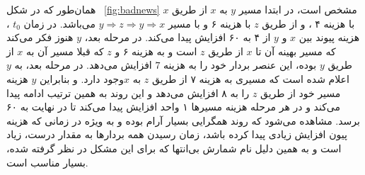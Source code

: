 همان‌طور که در شکل 
~\ref{fig:badnews}
مشخص است، در ابتدا مسیر $y$ به $x$ از طریق $x$ با هزینه ۴ ، و از طریق $z$‌ با هزینه ۶ و با مسیر $y\Rightarrow z\Rightarrow y\Rightarrow x$   می‌باشد. در زمان $t_{0}$ ، هزینه پیوند بین $x$ و $y$ از ۴ به ۶۰ افزایش پیدا می‌کند. در مرحله بعد، $y$ هنوز فکر می‌کند که مسیر بهینه آن تا $x$ از طریق $z$ است و به هزینه ۶ و  $z$ که قبلا مسیر آن به $x$ از طریق $y$ بوده، این عنصر بردار خود را به هزینه $7$ افزایش می‌دهد. در مرحله بعد، به  $y$  اعلام شده است که مسیری به هزینه ۷ از طریق $z$ به  $x$وجود دارد. و بنابراین $y$ هزینه مسیر خود از طریق $z$ را به ۸ افزایش می‌دهد و این روند به همین ترتیب ادامه پیدا می‌کند و در هر مرحله هزینه مسیرها ۱ واحد افزایش پیدا می‌کند تا در نهایت به ۶۰ برسد. مشاهده می‌شود که روند همگرایی بسیار آرام بوده و به ویژه در زمانی که هزینه پیون افزایش زیادی پیدا کرده باشد، زمان رسیدن همه بردارها به مقدار درست، زیاد است و به همین دلیل نام شمارش بی‌انتها که برای این مشکل در نظر گرفته شده، بسیار مناسب است. 
